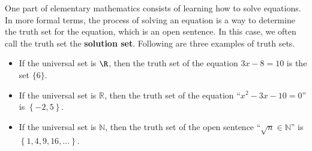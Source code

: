 %
%

\newpar
One part of elementary mathematics consists of learning how to solve equations.  In more formal terms, the process of solving an equation is a way to determine the truth set for the equation, which is an open sentence.  In this case, we often call the truth set the \textbf{solution set}.
%
Following are three examples of truth sets.
\begin{itemize}
  \item If the universal set is $\R$, then the truth set of the equation $3x - 8 = 10$ is the set $\{ 6 \}$.
  \item If the universal set is  $\mathbb{R}$, then the truth set of the equation ``$x^2  - 3x - 10 = 0$''  is  $\left\{ { - 2, 5} \right\}$.
  \item If the universal set is  $\mathbb{N}$, then the truth set of the open sentence  
``$\sqrt {n}  \in \mathbb{N}$''  is  $\left\{ {1, 4, 9, 16, \ldots } \right\}$.
\end{itemize}
\hbreak


\endinput
